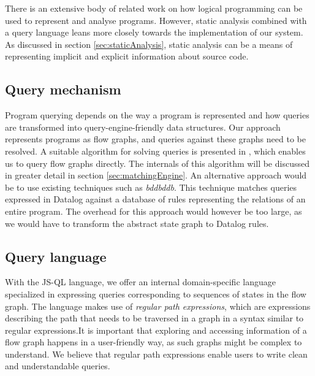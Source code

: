There is an extensive body of related work on how logical programming can be used to represent and analyse programs\cite{Reps1995}\cite{DatalogDBQueries}. However, static analysis combined with a query language leans more closely towards the implementation of our system.  As discussed in section \ref{sec:staticAnalysis}, static analysis can be a means of representing implicit and explicit information about source code. 

\subsection*{Query mechanism}

Program querying depends on the way a program is represented and how queries are transformed into query-engine-friendly data structures. Our approach represents programs as flow graphs, and queries against these graphs need to be resolved. A suitable algorithm for solving queries is presented in \cite{algoEngine}, which enables us to query flow graphs directly. The internals of this algorithm will be discussed in greater detail in section \ref{sec:matchingEngine}. An alternative approach would be to use existing techniques such as \textit{bddbddb}\cite{bddbddb}. This technique matches queries expressed in Datalog against a database of rules representing the relations of an entire program. The overhead for this approach would however be too large, as we would have to transform the abstract state graph to Datalog rules.

\subsection*{Query language}
With the JS-QL language, we offer an internal domain-specific language specialized in expressing queries corresponding to sequences of states in the flow graph. The language makes use of \textit{regular path expressions}, which are expressions describing the path that needs to be traversed in a graph in a syntax similar to regular expressions.It is important that exploring and accessing information of a flow graph happens in a user-friendly way, as such graphs might be complex to understand. We believe that regular path expressions enable users to write clean and understandable queries. 



